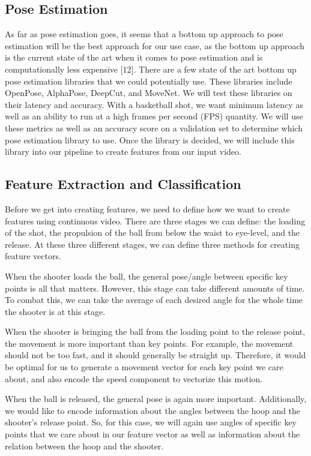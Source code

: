 \documentclass[10pt,twocolumn,letterpaper]{article}
\begin{document}
\subsection{Pose Estimation}
As far as pose estimation goes, it seems that a bottom up approach to pose estimation will be the best approach for our use case, as the bottom up approach is the
current state of the art when it comes to pose estimation and is computationally less expensive [12]. There are a few state of the art bottom up pose estimation libraries that we could potentially use. These
libraries include OpenPose, AlphaPose, DeepCut, and MoveNet. We will test these libraries on their latency and accuracy. With a basketball shot, we want minimum latency
as well as an ability to run at a high frames per second (FPS) quantity. We will use these metrics as well as an accuracy score on a validation set to determine which pose
estimation library to use. Once the library is decided, we will include this library into our pipeline to create features from our input video.

\subsection{Feature Extraction and Classification}
Before we get into creating features, we need to define how we want to create features using continuous video. There are three stages we can define: the loading of the shot, the propulsion of the ball from below the waist
to eye-level, and the release. At these three different stages, we can define three methods for creating feature vectors.

When the shooter loads the ball, the general pose/angle between specific key points is all that matters. However, this stage can take different amounts of time. To combat this,
we can take the average of each desired angle for the whole time the shooter is at this stage.

When the shooter is bringing the ball from the loading point to the release point, the movement is more important than key points. For example, the movement should not be too fast, and it should generally be straight up.
Therefore, it would be optimal for us to generate a movement vector for each key point we care about, and also encode the speed component to vectorize this motion.

When the ball is released, the general pose is again more important. Additionally, we would like to encode information about the angles between the hoop and the shooter's release point. So, for this case, we
will again use angles of specific key points that we care about in our feature vector as well as information about the relation between the hoop and the shooter.
\end{document}
